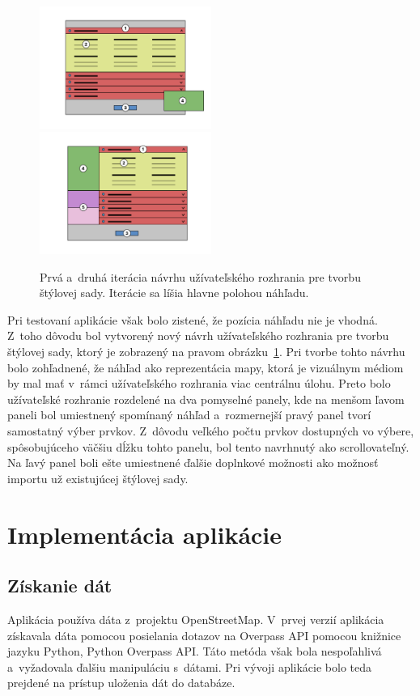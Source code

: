 \begin{figure}[hbt]
	\centering
	\includegraphics[width=0.5\textwidth]{obrazky-figures/prototype_style_1.pdf}\hfill
	\includegraphics[width=0.5\textwidth]{obrazky-figures/prototype_style_2.pdf}\hfill
	\caption{Prvá a~druhá iterácia návrhu užívateľského rozhrania pre tvorbu štýlovej sady. Iterácie sa líšia hlavne polohou náhľadu.}
	\label{mockup_style}
\end{figure}

Pri testovaní aplikácie však bolo zistené, že pozícia náhľadu nie je vhodná. Z~toho dôvodu bol vytvorený nový návrh užívateľského rozhrania pre tvorbu štýlovej sady, ktorý je zobrazený na pravom obrázku~\ref{mockup_style}. Pri tvorbe tohto návrhu bolo zohľadnené, že náhľad ako reprezentácia mapy, ktorá je vizuálnym médiom by mal mať v~rámci užívateľského rozhrania viac centrálnu úlohu. Preto bolo užívateľské rozhranie rozdelené na dva pomyselné panely, kde na menšom ľavom paneli bol umiestnený spomínaný náhľad a~rozmernejší pravý panel tvorí samostatný výber prvkov. Z~dôvodu veľkého počtu prvkov dostupných vo výbere, spôsobujúceho väčšiu dĺžku tohto panelu, bol tento navrhnutý ako scrollovateľný. Na ľavý panel boli ešte umiestnené ďalšie doplnkové možnosti ako možnosť importu už existujúcej štýlovej sady.


\chapter{Implementácia aplikácie}
\label{implementation}

\section{Získanie dát}
Aplikácia používa dáta z~projektu OpenStreetMap. V~prvej verzií aplikácia získavala dáta pomocou posielania dotazov na Overpass API pomocou knižnice jazyku Python, Python Overpass API. Táto metóda však bola nespoľahlivá a~vyžadovala ďalšiu manipuláciu s~dátami. Pri vývoji aplikácie bolo teda prejdené na prístup uloženia dát do databáze. 


